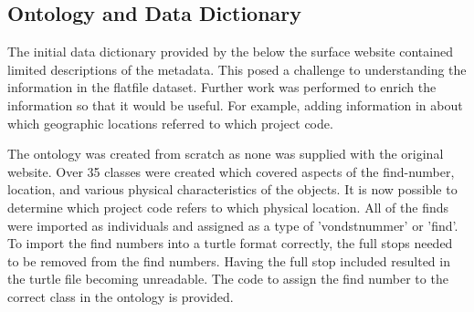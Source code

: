 \subsection{Ontology and Data Dictionary}
The initial data dictionary provided by the below the surface website contained limited descriptions of the metadata. This posed a challenge to understanding the information in the flatfile dataset.  Further work was performed to enrich the information so that it would be useful.  For example, adding information in about which geographic locations referred to which project code.

The ontology was created from scratch as none was supplied with the original website.  Over 35 classes were created which covered aspects of the find-number, location, and various physical characteristics of the objects.  It is now possible to determine which project code refers to which physical location.  All of the finds were imported as individuals and assigned as a type of 'vondstnummer' or 'find'.  To import the find numbers into a turtle format correctly, the full stops needed to be removed from the find numbers.  Having the full stop included resulted in the turtle file becoming unreadable. The code to assign the find number to the correct class in the ontology is provided.    
